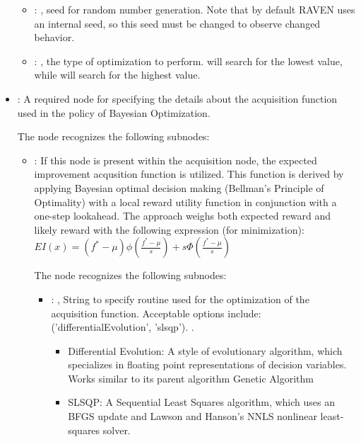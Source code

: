 \begin{itemize}
\begin{itemize}
        \item {}: ,
          seed for random number generation. Note that by default RAVEN uses an internal seed,
          so this seed must be changed to observe changed behavior. 

        \item {}: ,
          the type of optimization to perform.  will search for the lowest
           value, while  will search for the highest value.
      \end{itemize}

    \item {}:
      A required node for specifying                                                           the
      details about the acquisition function
      used in the policy of Bayesian Optimization.

      The  node recognizes the following subnodes:
      \begin{itemize}
        \item {}:
          If this node is present within the acquisition node,                         the expected
          improvement acqusition function is utilized.                         This function is
          derived by applying Bayesian optimal decision making (Bellman's Principle of Optimality)
          with a local reward utility function in conjunction with a one-step lookahead.
          The approach weighs both expected reward and likely reward with the
          following expression (for minimization):                         $EI(x) =
          (f^*-\mu)\phi(\frac{f^*-\mu}{s}) + s \Phi(\frac{f^*-\mu}{s})$

          The  node recognizes the following subnodes:
          \begin{itemize}
            \item {}: ,
              String to specify routine used for the optimization of the acquisition function.
              Acceptable options include: ('differentialEvolution', 'slsqp').
              .
              \begin{itemize}                                                  \item Differential
              Evolution: A style of evolutionary algorithm, which specializes in floating point
              representations of decision variables. Works similar to its parent algorithm Genetic
              Algorithm                                                  \item SLSQP: A Sequential
              Least Squares algorithm, which uses an BFGS update and
              Lawson and Hanson’s NNLS nonlinear least-squares solver.
              \end{itemize}


\end{itemize}
\end{itemize}
\end{itemize}
